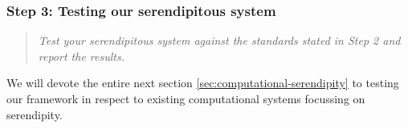\subsubsection*{Step 3: Testing our serendipitous system}

\begin{quote} {\em Test your serendipitous system against the standards stated in Step 2 and report the
results.}\end{quote}

\noindent We will devote the entire next section \ref{sec:computational-serendipity} to testing our framework in respect to existing computational systems focussing on serendipity. 

